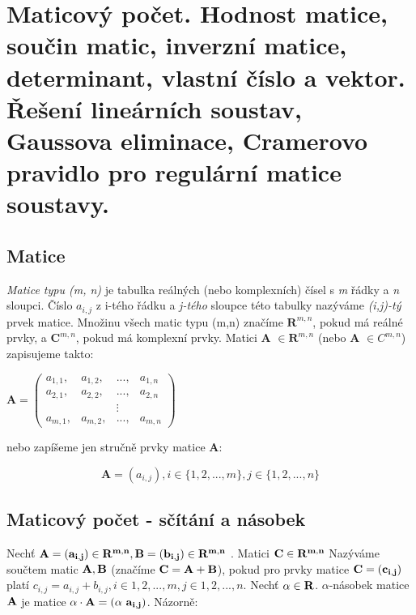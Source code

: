 \section[A7B01LAG - Matice]{Maticový počet. Hodnost matice, součin matic, inverzní matice, determinant, vlastní číslo a vektor. Řešení lineárních soustav, Gaussova eliminace, Cramerovo pravidlo pro regulární matice soustavy.}


\subsection*{Matice}
 \textit{Matice typu (m, n)} je tabulka reálných (nebo komplexních) čísel s \textit{m} řádky a \textit{n} sloupci. Číslo \textit{$a_{i,j}$} z i-tého řádku a \textit{j-tého} sloupce této tabulky nazýváme \textit{(i,j)-tý} prvek matice. Množinu všech matic typu (m,n) značíme $\textbf{R}^{m,n}$, pokud má reálné prvky, a $\textbf{C}^{m,n}$, pokud má komplexní prvky.
Matici \textbf{A} $\in \textbf{R}^{m,n}$ (nebo \textbf{A} $\in C^{m,n}$) zapisujeme takto:
\begin{center}
$\textbf{A} = \begin{pmatrix}
  a_{1,1}, & a_{1,2}, & ..., & a_{1,n} \\
  a_{2,1}, & a_{2,2}, & ..., & a_{2,n} \\
  && \vdots & \\
  a_{m,1}, & a_{m,2}, & ..., & a_{m,n}
 \end{pmatrix}$
\end{center}

nebo zapíšeme jen stručně prvky matice \textbf{A}:

$$\textbf{A} = (a_{i,j}), i \in \{1,2,...,m\}, j \in \{1,2,...,n\}$$

\subsection*{Maticový počet - sčítání a násobek}
 Nechť $\bf A = (a_{i,j}) \in R^{m,n} , B = (b_{i,j}) \in R^{m,n}$ . Matici $\bf C \in R^{m,n}$ Nazýváme součtem matic $\bf A, B$ (značíme $\bf C = A + B$), pokud pro prvky matice $\bf C = (c_{i,j})$ platí $c_{i,j} = a_{i,j} + b_{i,j} , i \in {1,2,...,m},j \in {1,2,...,n}$. Nechť $\bf \alpha \in R$. $\alpha$-násobek matice $\bf A$ je matice $\bf \alpha \cdot A = (\alpha~a_{i,j})$. Názorně:

